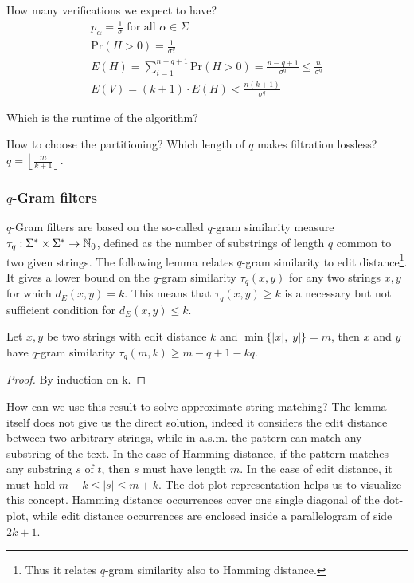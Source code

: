 How many verifications we expect to have?
\begin{eqnarray}
p_\alpha = \frac{1}{\sigma} \text{ for all } \alpha \in \Sigma\\
\text{Pr}(H > 0) = \frac{1}{\sigma^q}\\
E(H) = \sum_{i=1}^{n-q+1}{\text{Pr}(H > 0)} = \frac{n - q + 1}{\sigma^q} \leq \frac{n}{\sigma^q}\\
E(V) = (k + 1) \cdot E(H) < \frac{n (k + 1)}{\sigma^q}
\end{eqnarray}

Which is the runtime of the algorithm?

How to choose the partitioning? Which length of $q$ makes filtration lossless?
$q=\left \lfloor \frac{m}{k+1} \right \rfloor$.


\subsubsection{$q$-Gram filters}

$q$-Gram filters are based on the so-called $q$-gram similarity measure $\tau_q : \Sigma^{*} \times \Sigma^{*} \rightarrow \mathbb {N}_0$, defined as the number of substrings of length $q$ common to two given strings.
The following lemma relates $q$-gram similarity to edit distance\footnote{Thus it relates $q$-gram similarity also to Hamming distance.}.
It gives a lower bound on the $q$-gram similarity $\tau_q(x,y)$ for any two strings $x,y$ for which $d_E(x,y) = k$.
This means that $\tau_q(x,y) \geq k$ is a necessary but not sufficient condition for $d_E(x,y) \leq k$.
\begin{lemma}
\citep{?}
Let $x,y$ be two strings with edit distance $k$ and $\min\{|x|,|y|\} = m$, then $x$ and $y$ have $q$-gram similarity $\tau_q(m,k) \geq m - q + 1 - kq$.
\end{lemma}
\begin{proof}
By induction on k.
\end{proof}

\begin{example}
\end{example}

How can we use this result to solve approximate string matching?
The lemma itself does not give us the direct solution, indeed it considers the edit distance between two arbitrary strings, while in a.s.m. the pattern can match any substring of the text.
In the case of Hamming distance, if the pattern matches any substring $s$ of $t$, then $s$ must have length $m$.
In the case of edit distance, it must hold $m - k \leq |s| \leq m + k$.
The dot-plot representation helps us to visualize this concept.
Hamming distance occurrences cover one single diagonal of the dot-plot, while edit distance occurrences are enclosed inside a parallelogram of side $2k+1$.

